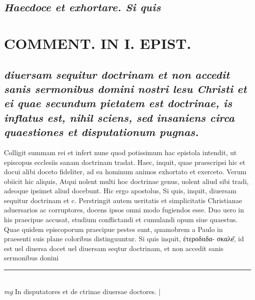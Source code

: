 \documentclass{article}
\begin{document}
\begin{pages}
\subsection*{\textit{Haecdoce et exhortare. Si quis }}
\section*{COMMENT. IN I. EPIST. }
{}
\subsection*{\textit{diuersam sequitur doctrinam et non accedit sanis sermonibus domini nostri lesu Christi et ei quae secundum pietatem est doctrinae, is inflatus est, nihil sciens, sed insaniens circa quaestiones et disputationum pugnas. }}\pstart Colligit summam rei et infert nune quod potissimum hac epistola intendit, ut episcopus ecclesiis sanam doctrinam tradat. Haec, inquit, quae praescripsi hic et docui alibi doceto fideliter, ad ea hominum animos exhortato et exerceto. Verum obiicit hic aliquis, Atqui nolent multi hoc doctrinae genus, uolent aliud sibi tradi, adeoque ipsimet aliud docebunt. Hic ergo apostolus, Si quis, inquit, diuersam sequitur doctrinam et c. Perstringit autem ueritatis et simplicitatis Christianae aduersarios ac corruptores, docens ipsos omni modo fugiendos esse. Duo uero in his praecipue accusat, studium conflictandi et cumulandi opum siue quaestus. Quae quidem episcoporum praecipue pestes sunt, quamobrem a Paulo in praesenti suis plane coloribus distinguuntur. Si quis inquit, ἐτεροδιιδα- σκαλe͂, id est uel diuersa docet uel diuersam seqtur doctrinam, et non accedit sanis sermonibus donini  \pend
\vspace{0.5cm}\noindent
\vspace{0.2cm}\rule{1cm}{0.2pt}\\ 
\hspace{0.2cm}\textit{mg}
\footnotesize In disputatores et de ctrinae diuersae doctores. 
\normalsize| 

\end{pages}
\end{document}
